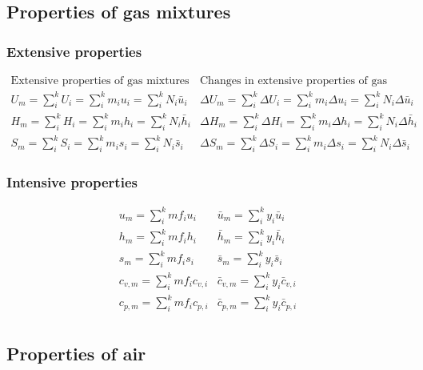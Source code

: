 \documentclass[11pt]{article}
\begin{document}
\subsection{Properties of gas mixtures}
\label{sec:orgba13532}

\subsubsection{Extensive properties}
\label{sec:orgf9795fd}
\begin{displaymath}
\begin{array}{c|c}
\text{Extensive properties of gas mixtures} & \text{Changes in extensive properties of gas mixtures} \\
\hline
U_m = \sum_i^k U_i = \sum_i^k m_i u_i = \sum_i^k N_i \bar{u}_i &
\Delta U_m = \sum_i^k \Delta U_i = \sum_i^k m_i \Delta u_i = \sum_i^k N_i \Delta \bar{u}_i \\
H_m = \sum_i^k H_i = \sum_i^k m_i h_i = \sum_i^k N_i \bar{h}_i &
\Delta H_m = \sum_i^k \Delta H_i = \sum_i^k m_i \Delta h_i = \sum_i^k N_i \Delta \bar{h}_i \\
S_m = \sum_i^k S_i = \sum_i^k m_i s_i = \sum_i^k N_i \bar{s}_i &
\Delta S_m = \sum_i^k \Delta S_i = \sum_i^k m_i \Delta s_i = \sum_i^k N_i \Delta \bar{s}_i
\end{array}
\end{displaymath}

\subsubsection{Intensive properties}
\label{sec:org251a7ed}
\begin{displaymath}
\begin{array}{c|c}
u_m = \sum_i^k mf_i u_i & \bar{u}_m = \sum_i^k y_i \bar{u}_i \\
h_m = \sum_i^k mf_i h_i & \bar{h}_m = \sum_i^k y_i \bar{h}_i \\
s_m = \sum_i^k mf_i s_i & \bar{s}_m = \sum_i^k y_i \bar{s}_i \\
c_{v,m} = \sum_i^k mf_i c_{v,i} & \bar{c}_{v,m} = \sum_i^k y_i \bar{c}_{v,i} \\
c_{p,m} = \sum_i^k mf_i c_{p,i} & \bar{c}_{p,m} = \sum_i^k y_i \bar{c}_{p,i} \\
\end{array}
\end{displaymath}

 \newpage

\subsection{Properties of air}
\label{sec:org0e5e98c}
\end{document}
